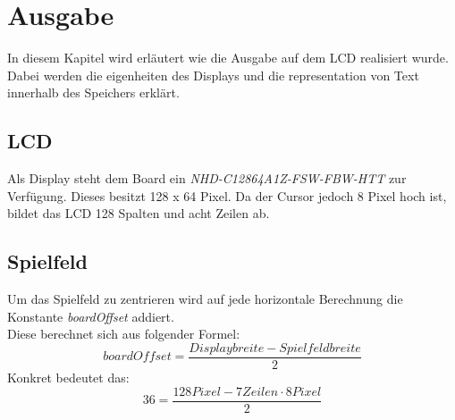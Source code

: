 \newpage
\section{Ausgabe}
    In diesem Kapitel wird erläutert wie die Ausgabe auf dem LCD realisiert wurde.
    Dabei werden die eigenheiten des Displays und die representation von Text innerhalb des Speichers erklärt.

    \subsection{LCD}
        Als Display steht dem Board ein \textit{NHD-C12864A1Z-FSW-FBW-HTT} zur Verfügung.
        Dieses besitzt 128 x 64 Pixel. Da der Cursor jedoch 8 Pixel hoch ist,
        bildet das LCD 128 Spalten und acht Zeilen ab.

    \subsection{Spielfeld}
        Um das Spielfeld zu zentrieren wird auf jede horizontale Berechnung die Konstante 
        \textit{boardOffset} addiert.\\
        Diese berechnet sich aus folgender Formel:
        \begin{equation}
            boardOffset = \dfrac{Displaybreite - Spielfeldbreite}{2}
        \end{equation}
        Konkret bedeutet das:
        \begin{equation}
            36 = \dfrac{128 Pixel - 7 Zeilen \cdot 8 Pixel}{2}
        \end{equation}
        

